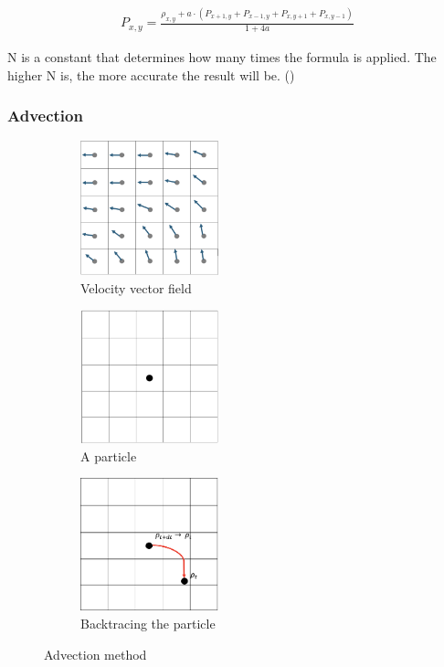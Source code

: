 \documentclass[a4paper,12pt,titlepage]{article}
\begin{document}
\[
	\begin{array}{ll}
		P_{x, y} = \frac{\rho_{x, y} + a \cdot (P_{x+1, y} + P_{x-1, y} + P_{x, y+1} + P_{x, y-1})}{1+4a}
	\end{array}
\]

N is a constant that determines how many times the formula is applied. The higher N is, the more accurate the result will be. (\cite{josstam})

\subsubsection{Advection}

\begin{figure}[H]
	\centering
	\begin{subfigure}{0.3\textwidth}
		\centering
		\includegraphics[width=4cm]{resources/advection1.png}
		\caption{Velocity vector field}
	\end{subfigure}
	\begin{subfigure}{0.3\textwidth}
		\centering
		\includegraphics[width=4cm]{resources/advection2.png}
		\caption{A particle}
		\label{fig:aparticle}
	\end{subfigure}
	\begin{subfigure}{0.3\textwidth}
		\centering
		\includegraphics[width=4cm]{resources/advection3.png}
		\caption{Backtracing the particle}
		\label{fig:backtrace}
	\end{subfigure}
	\caption {Advection method}
	\label{fig:advection}
\end{figure}
\end{document}
